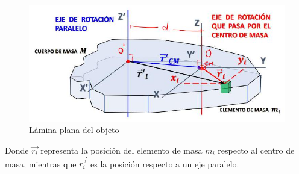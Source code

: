 \documentclass{article}
\begin{document}
\begin{figure}[H]
    \centering
    \includegraphics[scale=0.30]{2025_04_01_ea720b93e8ebb5d0c6aeg-05(1)}
    \caption{Lámina plana del objeto}
\end{figure}

Donde $\overrightarrow{r_{i}}$ representa la posición del elemento de masa $m_{i}$ respecto al centro de masa, mientras que $\overrightarrow{r_{i}}^{\prime}$ es la posición respecto a un eje paralelo. 
\end{document}
